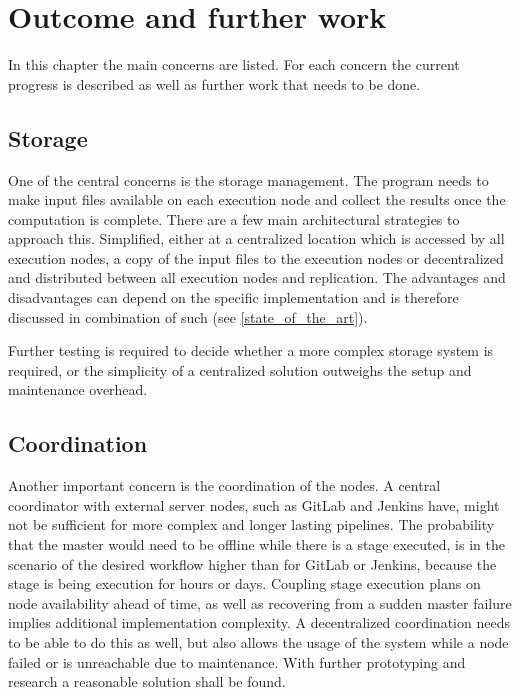 \chapter{Outcome and further work}

In this chapter the main concerns are listed.
For each concern the current progress is described as well as further work that needs to be done.

\section{Storage}

One of the central concerns is the storage management.
The program needs to make input files available on each execution node and collect the results once the computation is complete.
There are a few main architectural strategies to approach this.
Simplified, either at a centralized location which is accessed by all execution nodes, a copy of the input files to the execution nodes or decentralized and distributed between all execution nodes and replication.
The advantages and disadvantages can depend on the specific implementation and is therefore discussed in combination of such (see \autoref{state_of_the_art}).

Further testing is required to decide whether a more complex storage system is required, or the simplicity of a centralized solution outweighs the setup and maintenance overhead.


%

\section{Coordination}

Another important concern is the coordination of the nodes.
A central coordinator with external server nodes, such as GitLab and Jenkins have, might not be sufficient for more complex and longer lasting pipelines.
The probability that the master would need to be offline while there is a stage executed, is in the scenario of the desired workflow higher than for GitLab or Jenkins, because the stage is being execution for hours or days.
Coupling stage execution plans on node availability ahead of time, as well as recovering from a sudden master failure implies additional implementation complexity.
A decentralized coordination needs to be able to do this as well, but also allows the usage of the system while a node failed or is unreachable due to maintenance.
With further prototyping and research a reasonable solution shall be found.

